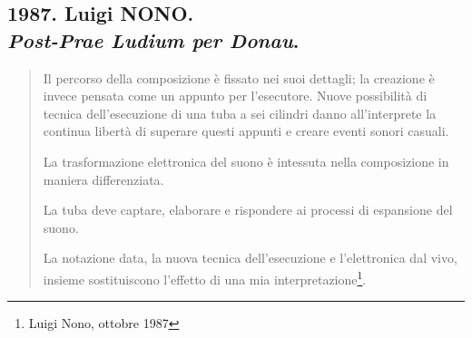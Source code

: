 
\subsection*{1987. Luigi NONO.\\\emph{Post-Prae Ludium per Donau}.}

\begin{quote}
	Il percorso della composizione è fissato nei suoi dettagli; la creazione è invece pensata come un appunto per l'esecutore. Nuove possibilità di tecnica dell'esecuzione di una tuba a sei cilindri danno all'interprete la continua libertà di superare questi appunti e creare eventi sonori casuali.

	La trasformazione elettronica del suono è intessuta nella composizione in maniera differenziata.

	La tuba deve captare, elaborare e rispondere ai processi di espansione del suono.

	La notazione data, la nuova tecnica dell'esecuzione e l'elettronica dal vivo, insieme sostituiscono l'effetto di una mia interpretazione\footnote{Luigi Nono, ottobre 1987}.
\end{quote}
